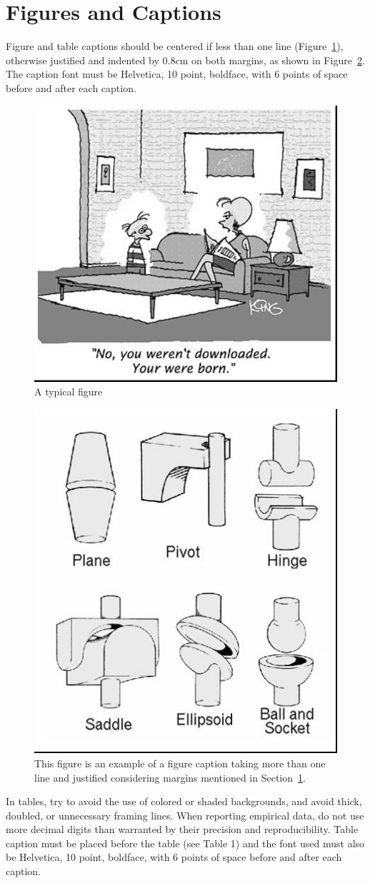 \documentclass[12pt]{article}
\begin{document}
\section{Figures and Captions}\label{sec:figs}


Figure and table captions should be centered if less than one line
(Figure~\ref{fig:exampleFig1}), otherwise justified and indented by 0.8cm on
both margins, as shown in Figure~\ref{fig:exampleFig2}. The caption font must
be Helvetica, 10 point, boldface, with 6 points of space before and after each
caption.

\begin{figure}[ht]
\centering
\includegraphics[width=.5\textwidth]{fig1.jpg}
\caption{A typical figure}
\label{fig:exampleFig1}
\end{figure}

\begin{figure}[ht]
\centering
\includegraphics[width=.3\textwidth]{fig2.jpg}
\caption{This figure is an example of a figure caption taking more than one
  line and justified considering margins mentioned in Section~\ref{sec:figs}.}
\label{fig:exampleFig2}
\end{figure}

In tables, try to avoid the use of colored or shaded backgrounds, and avoid
thick, doubled, or unnecessary framing lines. When reporting empirical data,
do not use more decimal digits than warranted by their precision and
reproducibility. Table caption must be placed before the table (see Table 1)
and the font used must also be Helvetica, 10 point, boldface, with 6 points of
space before and after each caption.
\end{document}
